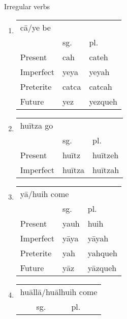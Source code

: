 \documentclass[12pt]{beamer}
\newcommand{\nah}[1]{\textcolor{nahgrn}{#1}}
\newcommand{\trs}[1]{\textcolor{nahblu}{#1}}
\begin{document}
\begin{frame}
\begin{columns}[t]
    \begin{column}{.18\linewidth}
      \begin{block}{Irregular verbs}
        \begin{enumerate}
        \item \begin{tabular}[t]{lll}
                \multicolumn{3}{l}{\nah{cā/ye} \trs{be}} \\
                & sg.   & pl.\\
                Present & \nah{cah} & \nah{cateh} \\
                Imperfect & \nah{yeya} & \nah{yeyah} \\
                Preterite & \nah{catca} & \nah{catcah} \\
                Future & \nah{yez} & \nah{yezqueh} \\
              \end{tabular}%
            \item \begin{tabular}[t]{lll}
                    \multicolumn{3}{l}{\nah{huītza} \trs{go}} \\
                    & sg.   & pl.\\
                    Present & \nah{huītz} & \nah{huītzeh} \\
                    Imperfect & \nah{huītza} & \nah{huītzah} \\
                  \end{tabular}%
                \item \begin{tabular}[t]{lll}
                        \multicolumn{3}{l}{\nah{yā/huih} \trs{come}} \\
                        & sg.   & pl.\\
                        Present & \nah{yauh} & \nah{huih} \\
                        Imperfect & \nah{yāya} & \nah{yāyah} \\
                        Preterite & \nah{yah} & \nah{yahqueh} \\
                        Future & \nah{yāz} & \nah{yāzqueh} \\
                      \end{tabular}%
                    \item \begin{tabular}[t]{lll}
                            \multicolumn{3}{l}{\nah{huāllā/huālhuih} \trs{come}} \\
                            & sg.   & pl.\\

\end{tabular}
\end{enumerate}
\end{block}
\end{column}
\end{columns}
\end{frame}
\end{document}
